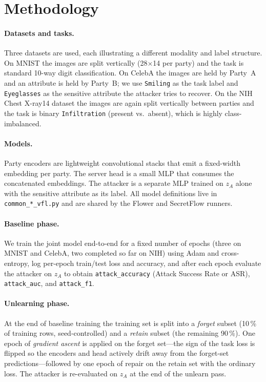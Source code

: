 \documentclass[letterpaper,twocolumn,10pt]{article}
\begin{document}
\section{Methodology}

\paragraph{Datasets and tasks.}
Three datasets are used, each illustrating a different modality and label
structure. On MNIST the images are split vertically (28$\times$14 per
party) and the task is standard 10-way digit classification. On CelebA
the images are held by Party~A and an attribute is held by Party~B; we
use \texttt{Smiling} as the task label and \texttt{Eyeglasses} as the
sensitive attribute the attacker tries to recover. On the NIH Chest
X-ray14 dataset the images are again split vertically between parties
and the task is binary \texttt{Infiltration} (present vs.\ absent),
which is highly class-imbalanced.

\paragraph{Models.}
Party encoders are lightweight convolutional stacks that emit a
fixed-width embedding per party. The server head is a small MLP that
consumes the concatenated embeddings. The attacker is a separate MLP
trained on $z_A$ alone with the sensitive attribute as its label. All
model definitions live in \texttt{common\_*\_vfl.py} and are shared by
the Flower and SecretFlow runners.

\paragraph{Baseline phase.}
We train the joint model end-to-end for a fixed number of epochs (three
on MNIST and CelebA, two completed so far on NIH) using Adam and
cross-entropy, log per-epoch train/test loss and accuracy, and after
each epoch evaluate the attacker on $z_A$ to obtain
\texttt{attack\_accuracy} (Attack Success Rate or ASR),
\texttt{attack\_auc}, and \texttt{attack\_f1}.

\paragraph{Unlearning phase.}
At the end of baseline training the training set is split into a
\emph{forget} subset (10\,\% of training rows, seed-controlled) and a
\emph{retain} subset (the remaining 90\,\%). One epoch of
\emph{gradient ascent} is applied on the forget set---the sign of the
task loss is flipped so the encoders and head actively drift away from
the forget-set predictions---followed by one epoch of repair on the
retain set with the ordinary loss. The attacker is re-evaluated on
$z_A$ at the end of the unlearn pass.
\end{document}
